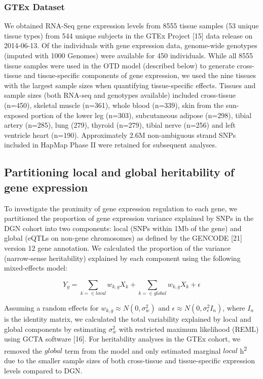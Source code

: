 \documentclass[]{article}
\begin{document}
\subsubsection{GTEx Dataset}\label{gtex-dataset}

We obtained RNA-Seq gene expression levels from 8555 tissue samples (53
unique tissue types) from 544 unique subjects in the GTEx Project
{[}15{]} data release on 2014-06-13. Of the individuals with gene
expression data, genome-wide genotypes (imputed with 1000 Genomes) were
available for 450 individuals. While all 8555 tissue samples were used
in the OTD model (described below) to generate cross-tissue and
tissue-specific components of gene expression, we used the nine tissues
with the largest sample sizes when quantifying tissue-specific effects.
Tissues and sample sizes (both RNA-seq and genotypes available) included
cross-tissue (n=450), skeletal muscle (n=361), whole blood (n=339), skin
from the sun-exposed portion of the lower leg (n=303), subcutaneous
adipose (n=298), tibial artery (n=285), lung (279), thyroid (n=279),
tibial nerve (n=256) and left ventricle heart (n=190). Approximately
2.6M non-ambiguous strand SNPs included in HapMap Phase II were retained
for subsequent analyses.

\subsection{Partitioning local and global heritability of gene
expression}\label{partitioning-local-and-global-heritability-of-gene-expression}

To investigate the proximity of gene expression regulation to each gene,
we partitioned the proportion of gene expression variance explained by
SNPs in the DGN cohort into two components: local (SNPs within 1Mb of
the gene) and global (eQTLs on non-gene chromosomes) as defined by the
GENCODE {[}21{]} version 12 gene annotation. We calculated the
proportion of the variance (narrow-sense heritability) explained by each
component using the following mixed-effects model:

\[ Y_g = \sum_{k = \in local}w_{k,g} X_k + \sum_{k = \in global}w_{k,g} X_k + \epsilon \]

Assuming a random effects for \(w_{k,g} \approx N(0, \sigma^2_w)\) and
\(\epsilon \approx N(0, \sigma^2_{\epsilon} I_n)\), where \(I_n\) is the
identity matrix, we calculated the total variability explained by local
and global components by estimating \(\sigma^2_w\) with restricted
maximum likelihood (REML) using GCTA software {[}16{]}. For heritability
analyses in the GTEx cohort, we removed the \(global\) term from the
model and only estimated marginal \(local\) h\textsuperscript{2} due to
the smaller sample sizes of both cross-tissue and tissue-specific
expression levels compared to DGN.
\end{document}
